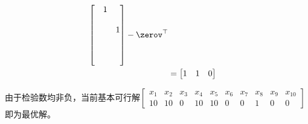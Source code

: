 \documentclass{ctexart}
\begin{document}
\begin{example} 
\begin{align*}
\begin{bmatrix}
                                                             & 1 &   \\
                                                             &   &   \\
                                                             &   & 1 \\
                                                             &   &   \\
                                                             &   &   \\
                                                             &   &   \\
                                                       \end{bmatrix} - \zerov^\top \\
                       & = \begin{bmatrix}
                               1 & 1 & 0
                           \end{bmatrix}
    \end{align*}

    由于检验数均非负，当前基本可行解$\begin{bmatrix}
        x_1 & x_2 & x_3 & x_4 & x_5 & x_6 & x_7 & x_8 & x_9 & x_{10} \\
        10  & 10  & 0   & 10  & 10  & 0   & 0   & 1   & 0   & 0
    \end{bmatrix}$即为最优解。
\end{example}
\end{document}
